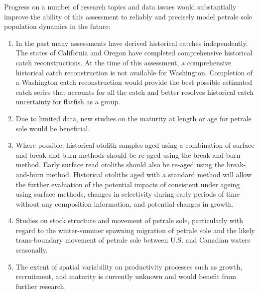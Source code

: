 \documentclass[12pt,]{article}
\begin{document}
Progress on a number of research topics and data issues would
substantially improve the ability of this assessment to reliably and
precisely model petrale sole population dynamics in the future:

\begin{enumerate}

\item In the past many assessments have derived historical catches independently. The states of California and Oregon have completed comprehensive historical catch reconstructions. At the time of this assessment, a comprehensive historical catch reconstruction is not available for Washington. Completion of a Washington catch reconstruction would provide the best possible estimated catch series that accounts for all the catch and better resolves historical catch uncertainty for flatfish as a group.

\item Due to limited data, new studies on the maturity at length or age for petrale sole would be beneficial.

\item Where possible, historical otolith samples aged using a combination of surface and break-and-burn methods should be re-aged using the break-and-burn method. Early surface read otoliths should also be re-aged using the break-and-burn method. Historical otoliths aged with a standard method will allow the further evaluation of the potential impacts of consistent under ageing using surface methods, changes in selectivity during early periods of time without any composition information, and potential changes in growth.

\item Studies on stock structure and movement of petrale sole, particularly with regard to the winter-summer spawning migration of petrale sole and the likely trans-boundary movement of petrale sole between U.S. and Canadian waters seasonally.

\item The extent of spatial variability on productivity processes such as growth, recruitment, and maturity is currently unknown and would benefit from further research.

\end{enumerate}
\end{document}
